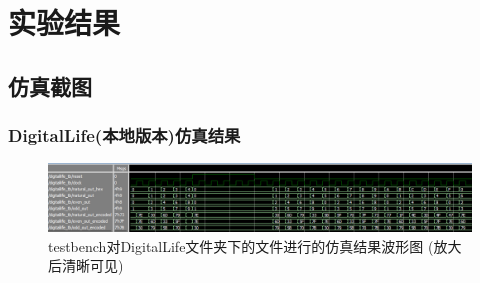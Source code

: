 \documentclass[UTF8]{article}
\begin{document}

 

\section{实验结果}
\subsection{仿真截图}



\subsubsection{DigitalLife(本地版本)仿真结果}
\begin{figure}[h]
    \centering
    \includegraphics[width=\textwidth]{DL_testbench.png}
    \caption{testbench对DigitalLife文件夹下的文件进行的仿真结果波形图 (放大后清晰可见)}
\end{figure}
\end{document}
